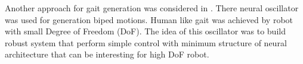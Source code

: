 \documentclass[11pt,a4paper]{article}
\begin{document}
Another approach for gait generation was considered in \cite{miyakoshi1998three}. There neural oscillator was used for generation biped motions. Human like gait was achieved by robot with small Degree of Freedom (DoF). The idea of this oscillator was to build robust system that perform simple control with minimum structure of neural architecture that can be interesting for high DoF robot.
\newpage



  
\end{document}

